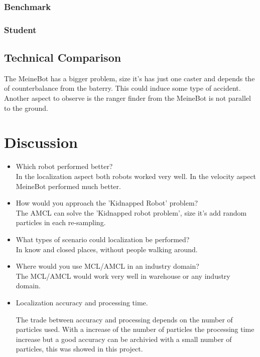 \documentclass[10pt,journal,compsoc]{IEEEtran}
\begin{document}
\subsubsection{Benchmark}
\subsubsection{Student}

\subsection{Technical Comparison} %

The MeineBot has a bigger problem, size it's has just one caster and depends the of counterbalance from the baterry.
    This could induce some type of accident.
    Another aspect to observe is the ranger finder from the MeineBot is not parallel to the ground.
\section{Discussion}

\begin{itemize}
\item Which robot performed better?\\
  In the localization aspect both robots worked very well. In the velocity aspect MeineBot performed much better.
\item How would you approach the 'Kidnapped Robot' problem?\\
  The AMCL can solve the 'Kidnapped robot problem', size it's add random particles in each re-sampling.
\item What types of scenario could localization be performed?\\
  In know and closed places, without people walking around.
  
\item Where would you use MCL/AMCL in an industry domain?\\
  The MCL/AMCL would work very well in warehouse or any industry domain.
\item Localization accuracy and processing time.


  The trade between accuracy and processing depends on the number of particles used. With a increase of the number of
    particles the processing time increase but a good accuracy can be archivied with a small number of particles, this
    was showed in this project.

\end{itemize}
\end{document}

